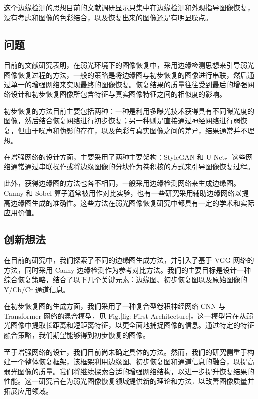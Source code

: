 \documentclass[a4paper, 10pt]{article}
\begin{document}
		这个边缘检测的思想目前的文献调研显示只集中在边缘检测和外观指导图像恢复，没有考虑和图像的色彩结合，以及恢复出来的图像还是有明显噪点。
		
		\subsection{问题} 
		
		目前的文献研究表明，在弱光环境下的图像恢复中，采用边缘检测思想来引导弱光图像恢复过程的方法，一般的策略是将边缘图与初步恢复的图像进行串联，然后通过单一的增强网络来实现最终的图像恢复。恢复结果的质量往往受到最后的增强网络设计和初步恢复图像所包含特征与真实图像特征之间的相似度的影响。
		
		初步恢复的方法目前主要包括两种：一种是利用多曝光技术获得具有不同曝光度的图像，然后结合恢复网络进行初步恢复；另一种则是直接通过神经网络进行弱恢复，但由于噪声和伪影的存在，以及色彩与真实图像之间的差异，结果通常并不理想。
		
		在增强网络的设计方面，主要采用了两种主要架构：StyleGAN 和 U-Net。这些网络通常通过串联操作或将边缘图像的分块作为卷积核的方式来引导图像恢复过程。
		
		此外，获得边缘图的方法也各不相同，一般采用边缘检测网络来生成边缘图。Canny 和 Sobel 算子通常被用作对比实验，也有一些研究采用辅助边缘网络以提高边缘图生成的准确性。这些方法在弱光图像恢复研究中都具有一定的学术和实际应用价值。
		
		\subsection{创新想法}
		
		在目前的研究中，我们探索了不同的边缘图生成方法，并引入了基于 VGG 网络的方法，同时采用 Canny 边缘检测作为参考对比方法。我们的主要目标是设计一种综合恢复策略，结合了以下几个关键元素：边缘图、初步恢复图以及原始图像的 Y/Cb/Cr 通道信息。
		
		在初步恢复图的生成方面，我们采用了一种复合型卷积神经网络 CNN 与 Transformer 网络的混合模型，见 Fig.\ref{fig: First Architecture}。这一模型旨在从弱光图像中提取长距离和短距离特征，以更全面地捕捉图像的信息。通过特定的特征融合策略，我们期望能够得到初步恢复的图像。
		
		至于增强网络的设计，我们目前尚未确定具体的方法。然而，我们的研究侧重于构建一个整体恢复框架，该框架利用边缘图、初步恢复图和通道信息的融合，以提高弱光图像的质量。我们将继续探索合适的增强网络结构，以进一步提升恢复结果的性能。这一研究旨在为弱光图像恢复领域提供新的理论和方法，以改善图像质量并拓展应用领域。
		
\end{document}
